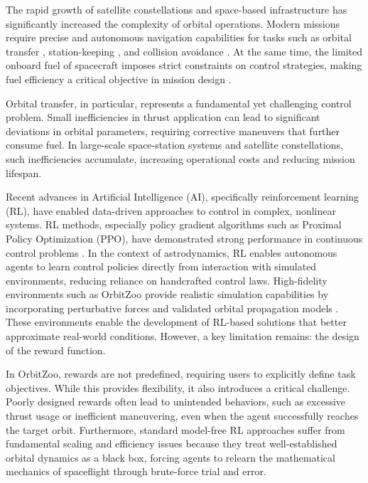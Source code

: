 \documentclass[paper]{ieice}
\begin{document}
The rapid growth of satellite constellations and space-based infrastructure has significantly increased the complexity of orbital operations. Modern missions require precise and autonomous navigation capabilities for tasks such as orbital transfer \cite{zaidi2023cascaded}, station-keeping \cite{bonasera2023stationkeeping}, and collision avoidance \cite{kazemi2024,qu2022spacecraft}. At the same time, the limited onboard fuel of spacecraft imposes strict constraints on control strategies, making fuel efficiency a critical objective in mission design \cite{tipaldi2022}.

Orbital transfer, in particular, represents a fundamental yet challenging control problem. Small inefficiencies in thrust application can lead to significant deviations in orbital parameters, requiring corrective maneuvers that further consume fuel. In large-scale space-station systems and satellite constellations, such inefficiencies accumulate, increasing operational costs and reducing mission lifespan.

Recent advances in Artificial Intelligence (AI), specifically reinforcement learning (RL), have enabled data-driven approaches to control in complex, nonlinear systems. RL methods, especially policy gradient algorithms such as Proximal Policy Optimization (PPO), have demonstrated strong performance in continuous control problems \cite{schulman2017ppo,kazemi2024}. In the context of astrodynamics, RL enables autonomous agents to learn control policies directly from interaction with simulated environments, reducing reliance on handcrafted control laws.
High-fidelity environments such as OrbitZoo provide realistic simulation capabilities by incorporating perturbative forces and validated orbital propagation models \cite{orbitzoo}. These environments enable the development of RL-based solutions that better approximate real-world conditions. However, a key limitation remains: the design of the reward function.

In OrbitZoo, rewards are not predefined, requiring users to explicitly define task objectives. While this provides flexibility, it also introduces a critical challenge. Poorly designed rewards often lead to unintended behaviors, such as excessive thrust usage or inefficient maneuvering, even when the agent successfully reaches the target orbit. Furthermore, standard model-free RL approaches suffer from fundamental scaling and efficiency issues because they treat well-established orbital dynamics as a black box, forcing agents to relearn the mathematical mechanics of spaceflight through brute-force trial and error.
\end{document}
